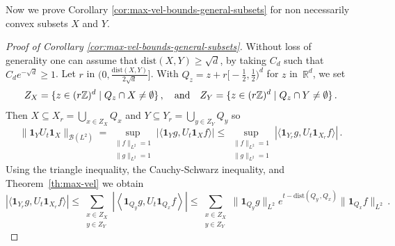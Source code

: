 \documentclass[12pt]{article}
\newcommand{\dXY}{{\mathrm{dist}(X,Y)}}
\theoremstyle{plain}
\begin{document}
Now we prove Corollary \ref{cor:max-vel-bounds-general-subsets} for non necessarily convex subsets $X$ and $Y$.
%
\begin{proof}[Proof of Corollary \ref{cor:max-vel-bounds-general-subsets}]Without loss of generality one can assume that $\dXY\geq \sqrt{d}$, by taking $C_d$ such that~$C_d e^{-\sqrt{d}}\geq 1$.
Let $r$ in $(0,\frac{\dXY}{2\sqrt{d}}]$. With $Q_{z}=z+r\big[-\frac{1}{2},\frac{1}{2}\big)^d$ for $z$ in~$\mathbb{R}^{d}$, we set 
\[
Z_{X}=\{z\in(r\mathbb{Z})^{d}\mid Q_{z}\cap X\neq\emptyset\}\,,\quad\textnormal{and}\quad 
Z_{Y}=\{z\in(r\mathbb{Z})^{d}\mid Q_{z}\cap Y\neq\emptyset\}\,.
\]
Then $X\subseteq X_r = \bigcup_{x\in Z_{X}}Q_{x}$ and $Y \subseteq Y_r = \bigcup_{y\in Z_{Y}}Q_{y}$ so
\[
\|\mathbf{1}_{Y}U_{t}\mathbf{1}_{X}\|_{\mathcal{B}(L^{2})} 
= \sup_{\substack{\|f\|_{L^{2}}=1\\ \|g\|_{L^{2}}=1} }|\langle\mathbf{1}_{Y}g,U_{t}\mathbf{1}_{X}f\rangle|
\leq\sup_{\substack{\|f\|_{L^{2}}=1\\ \|g\|_{L^{2}}=1}}|\langle\mathbf{1}_{Y_r}g,U_{t}\mathbf{1}_{X_r}f\rangle|\,.
\]
Using the triangle inequality, the Cauchy-Schwarz inequality, and Theorem~\ref{th:max-vel} we obtain
\[
|\langle  \mathbf{1}_{Y_r}g, U_{t}\mathbf{1}_{X_r}f\rangle| 
  \leq\sum_{\substack{x\in Z_{X}\\y\in Z_{Y}}}\left|\left\langle \mathbf{1}_{Q_{y}}g,U_{t}\mathbf{1}_{Q_{x}}f\right\rangle \right|
  \leq\sum_{\substack{x\in Z_{X}\\y\in Z_{Y}}}\|\mathbf{1}_{Q_{y}}g\|_{L^{2}}e^{t-\mathrm{dist}(Q_{y}\,,Q_{x})}\|\mathbf{1}_{Q_{x}}f\|_{L^{2}}\,.
\]


\end{proof}
\end{document}
